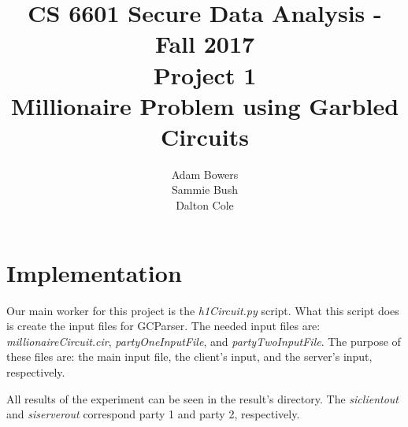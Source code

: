 \documentclass[times]{article}
\begin{document}
	\title{CS 6601 Secure Data Analysis - Fall 2017 \\ Project 1 \\ Millionaire Problem using Garbled Circuits}
	\author{Adam Bowers \\ Sammie Bush \\ Dalton Cole}
	\date{}
	\maketitle

	\section{Implementation}
	Our main worker for this project is the \textit{h1Circuit.py} script. What this script does is create the input files for GCParser. The needed input files are: \textit{millionaireCircuit.cir}, \textit{partyOneInputFile}, and \textit{partyTwoInputFile}. The purpose of these files are: the main input file, the client's input, and the server's input, respectively. 
	
	All results of the experiment can be seen in the result's directory. The \textit{siclientout} and \textit{siserverout} correspond party 1 and party 2, respectively. 

	
\end{document}
